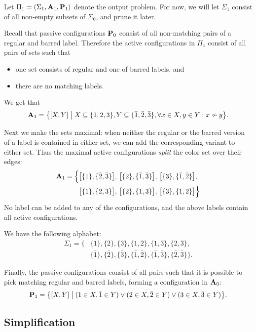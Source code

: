Let $\Pi_1 = (\Sigma_1, \mathbf{A}_1, \mathbf{P}_1)$ denote the output problem. For now, we will let $\Sigma_1$ consist of all non-empty subsets of $\Sigma_0$, and prune it later.

Recall that passive configurations $\mathbf{P}_0$ consist of all non-matching pairs of a regular and barred label. Therefore the active configurations in $\Pi_1$ consist of all pairs of sets such that
\begin{itemize}[noitemsep]
	\item one set consists of regular and one of barred labels, and
	\item there are no matching labels.
\end{itemize}
We get that
\[
	\collA_1 = \bigl\{ [X,Y] \bigm| X \subseteq \{1,2,3\}, Y \subseteq \{\bar{1},\bar{2},\bar{3}\}, \forall x \in X, y \in Y: x \nsim y \bigr\}.
\]

Next we make the sets maximal: when neither the regular or the barred version of a label is contained in either set, we can add the corresponding variant to either set. Thus the maximal active configurations \emph{split} the color set over their edges:
\[\begin{split}
	\mathbf{A}_1 = \Bigl\{& 
	\bigl[\{1\},\{\bar{2},\bar{3}\}\bigr],\,
	\bigl[\{2\},\{\bar{1},\bar{3}\}\bigr],\,
	\bigl[\{3\},\{\bar{1},\bar{2}\}\bigr],\, \\
	&\bigl[\{\bar{1}\},\{2,3\}\bigr],\,
	\bigl[\{\bar{2}\},\{1,3\}\bigr],\,
	\bigl[\{\bar{3}\},\{1,2\}\bigr] 
	\Bigr\}
\end{split}\]
No label can be added to any of the configurations, and the above labels contain all active configurations.

We have the following alphabet: 
\[\begin{split}
	\Sigma_1 = \bigl\{& 
	\{1\}, \{2\}, \{3\}, \{1,2\},\{1,3\}, \{2,3\}, \\
	&\{\bar{1}\}, \{\bar{2}\}, \{\bar{3}\}, \{\bar{1},\bar{2}\},\{\bar{1},\bar{3}\}, \{\bar{2},\bar{3}\} \bigr\}.
\end{split}\]

Finally, the passive configurations consist of all pairs such that it is possible to pick matching regular and barred labels, forming a configuration in $\mathbf{A}_0$:
\[
	\mathbf{P}_1 = \bigl\{ [X,Y] \bigm| (1 \in X, \bar{1} \in Y) \vee (2 \in X, \bar{2} \in Y) \vee (3 \in X, \bar{3} \in Y) \bigr\}.
\]

\subsection{Simplification}


